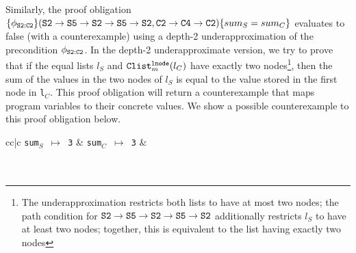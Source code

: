 Similarly, the proof obligation
$\{\phi_{{\tt S2:C2}}\} ({\tt S2\rightarrow S5\rightarrow S2\rightarrow S5\rightarrow S2}, {\tt C2\rightarrow C4\rightarrow C2}) \\ \{sum_{S} = sum_{C}\}$ evaluates to false (with a counterexample) using
a depth-2 underapproximation of the precondition $\phi_{{\tt S2:C2}}$.
In the depth-2 underapproximate version, we try to prove that
if the equal lists $l_S$ and ${\tt Clist}^{{\tt lnode}}_{m}(l_C)$
have exactly two
nodes\footnote{The underapproximation
restricts both lists to have at most
two nodes; the path condition for ${\tt S2\rightarrow S5\rightarrow S2\rightarrow S5\rightarrow S2}$ additionally
restricts $l_S$ to have at least two nodes; together, this is equivalent to the list having
exactly two nodes}, then
the sum of the values in the two nodes of $l_S$ is equal to the
value stored in the first node in {\tt l}$_C$.
This proof obligation will return a counterexample that
maps program variables to their concrete values. We show a
possible counterexample to this proof obligation below.
%
\begin{small}
\begin{center}
\begin{footnotesize}
\begin{tabular}{cc|c}
{\tt sum$_S$ $\mapsto$ 3} & {\tt sum$_C$ $\mapsto$ 3} &  \\
 \\
 \\
\end{tabular}
\end{footnotesize}
\end{center}
\end{small}

